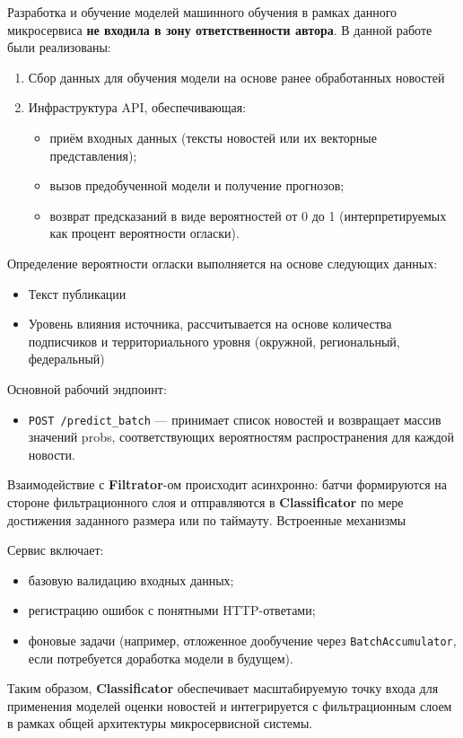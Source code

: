 Разработка и обучение моделей машинного обучения в рамках данного микросервиса \textbf{не входила в зону ответственности автора}.
В данной работе были реализованы:
\begin{enumerate}
    \item Сбор данных для обучения модели на основе ранее обработанных новостей
    \item Инфраструктура API, обеспечивающая:
    \begin{itemize}
        \item приём входных данных (тексты новостей или их векторные представления);
        \item вызов предобученной модели и получение прогнозов;
        \item возврат предсказаний в виде вероятностей от 0 до 1 (интерпретируемых как процент вероятности огласки).
    \end{itemize}
\end{enumerate}

Определение вероятности огласки выполняется на основе следующих данных:
\begin{itemize}
    \item Текст публикации
    \item Уровень влияния источника, рассчитывается на основе количества подписчиков и территориального уровня (окружной,  региональный, федеральный)
\end{itemize}

Основной рабочий эндпоинт:
\begin{itemize}
    \item \texttt{POST /predict\_batch} — принимает список новостей и возвращает массив значений probs, соответствующих вероятностям распространения для каждой новости.
\end{itemize}

Взаимодействие с \textbf{Filtrator}-ом происходит асинхронно: батчи формируются на стороне фильтрационного слоя и отправляются в \textbf{Classificator} по мере достижения заданного размера или по таймауту.
Встроенные механизмы

Сервис включает:
\begin{itemize}
    \item базовую валидацию входных данных;
    \item регистрацию ошибок с понятными HTTP-ответами;
    \item фоновые задачи (например, отложенное дообучение через \texttt{BatchAccumulator}, если потребуется доработка модели в будущем).
\end{itemize}

Таким образом, \textbf{Classificator} обеспечивает масштабируемую точку входа для применения моделей оценки новостей и интегрируется с фильтрационным слоем в рамках общей архитектуры микросервисной системы.
